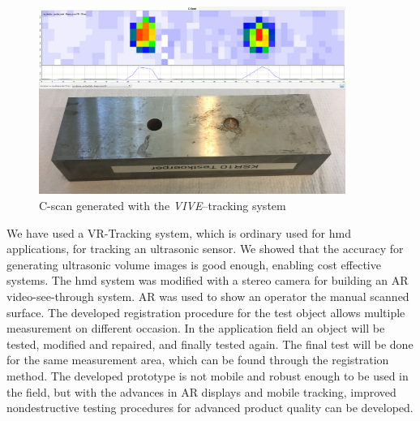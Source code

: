 \documentclass{VRARWorkshop}
\begin{document}
\begin{figure}[h!]
    \begin{center}
        \includegraphics[width=100mm]{images/CScanARUS}
        \caption{\label{fig:resultCScan} C-scan generated with the \textit{VIVE}--tracking system}
    \end{center}
\end{figure}

We have used a VR-Tracking system, which is ordinary used for {\sc hmd} applications, for tracking an ultrasonic sensor. We showed that the accuracy for generating ultrasonic volume images is good enough, enabling cost effective systems. The {\sc hmd} system was modified with a stereo camera for building an AR video-see-through system. AR was used to show an operator the manual scanned surface. The developed registration procedure for the test object allows multiple measurement on different occasion. In the application field an object will be tested, modified and repaired, and finally tested again. The final test will be done for the same measurement area, which can be found through the registration method. The developed prototype is not mobile and robust enough to be used in the field, but with the advances in AR displays and mobile tracking, improved nondestructive testing procedures for advanced product quality can be developed.

\VRARsetbibstyle

\end{document}
